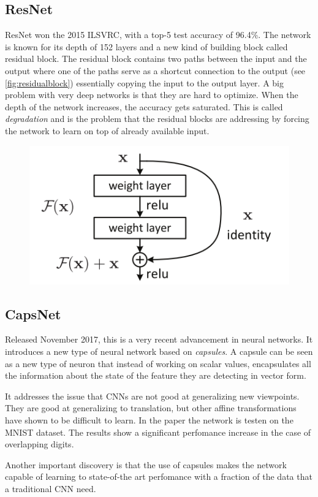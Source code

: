 \subsection{ResNet}\label{subsection:resnet}
ResNet won the 2015 ILSVRC, with a top-5 test accuracy of 96.4\%. The network is known for its depth of 152 layers and a new kind of building block called residual block. The residual block contains two paths between the input and the output where one of the paths serve as a shortcut connection to the output (see \autoref{fig:residualblock}) essentially copying the input to the output layer. A big problem with very deep networks is that they are hard to optimize. When the depth of the network increases, the accuracy gets saturated. This is called \emph{degradation} and is the problem that the residual blocks are addressing by forcing the network to learn on top of already available input. 

\begin{figure}[H]
	\centering
	\includegraphics[width=0.5\linewidth]{fig/residual.png}
	\label{fig:residualblock}
\end{figure}


\subsection{CapsNet}
Released November 2017, this is a very recent advancement in neural networks. It introduces a new type of neural network based on \emph{capsules}. A capsule can be seen as a new type of neuron that instead of working on scalar values, encapsulates all the information about the state of the feature they are detecting in vector form.

It addresses the issue that CNNs are not good at generalizing new viewpoints. They are good at generalizing to translation, but other affine transformations have shown to be difficult to learn. In the paper the network is testen on the MNIST dataset. The results show a significant perfomance increase in the case of overlapping digits. 

Another important discovery is that the use of capsules makes the network capable of learning to state-of-the art perfomance with a fraction of the data that a traditional CNN need.



